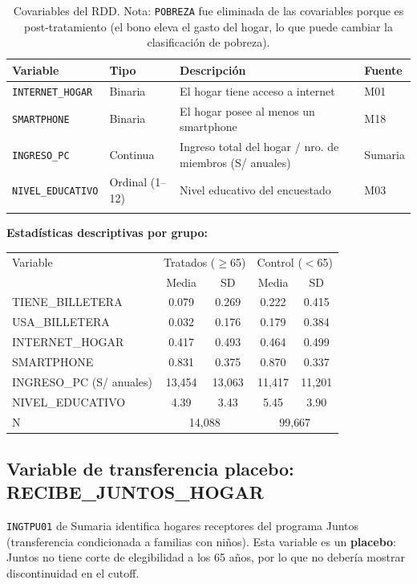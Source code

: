\documentclass[12pt, a4paper]{article}
\begin{document}
\begin{longtable}{@{}llp{6.5cm}l@{}}
\toprule
Variable & Tipo & Descripción & Fuente \\\midrule
\endhead
\texttt{INTERNET\_HOGAR} & Binaria & El hogar tiene acceso a internet & M01 \\
\texttt{SMARTPHONE} & Binaria & El hogar posee al menos un smartphone & M18 \\
\texttt{INGRESO\_PC} & Continua & Ingreso total del hogar / nro. de miembros (S/ anuales) & Sumaria \\
\texttt{NIVEL\_EDUCATIVO} & Ordinal (1--12) & Nivel educativo del encuestado & M03 \\
\bottomrule
\caption{Covariables del RDD. Nota: \texttt{POBREZA} fue eliminada de las covariables porque es post-tratamiento (el bono eleva el gasto del hogar, lo que puede cambiar la clasificación de pobreza).}
\end{longtable}

\textbf{Estadísticas descriptivas por grupo:}

\begin{center}
\begin{tabular}{lcccc}
\toprule
Variable & \multicolumn{2}{c}{Tratados ($\geq$65)} & \multicolumn{2}{c}{Control ($<$65)} \\
 & Media & SD & Media & SD \\\midrule
TIENE\_BILLETERA & 0.079 & 0.269 & 0.222 & 0.415 \\
USA\_BILLETERA & 0.032 & 0.176 & 0.179 & 0.384 \\
INTERNET\_HOGAR & 0.417 & 0.493 & 0.464 & 0.499 \\
SMARTPHONE & 0.831 & 0.375 & 0.870 & 0.337 \\
INGRESO\_PC (S/ anuales) & 13{,}454 & 13{,}063 & 11{,}417 & 11{,}201 \\
NIVEL\_EDUCATIVO & 4.39 & 3.43 & 5.45 & 3.90 \\
N & \multicolumn{2}{c}{14{,}088} & \multicolumn{2}{c}{99{,}667} \\
\bottomrule
\end{tabular}
\end{center}

\subsection{Variable de transferencia placebo: RECIBE\_JUNTOS\_HOGAR}

\texttt{INGTPU01} de Sumaria identifica hogares receptores del programa
Juntos (transferencia condicionada a familias con niños). Esta variable es
un \textbf{placebo}: Juntos no tiene corte de elegibilidad a los 65 años,
por lo que no debería mostrar discontinuidad en el cutoff.
\end{document}

